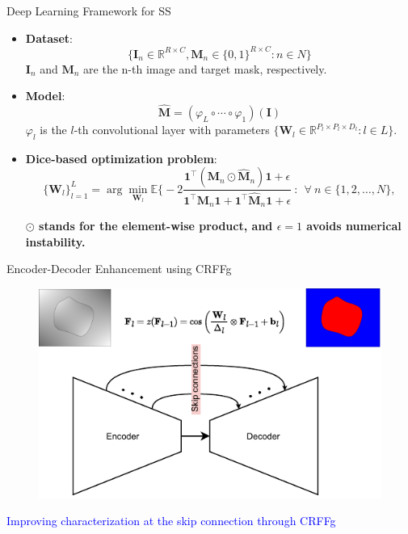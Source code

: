 \documentclass[aspectratio=169]{beamer}
\begin{document}
\begin{frame}{Deep Learning Framework for SS}


\begin{itemize}
    \item \textbf{Dataset}: $$\{\mathbf{I}_n \in \mathbb{R}^{R \times C} , \mathbf{M}_n \in \{ 0, 1\} ^{R \times C} : n \in N\}$$
    $\mathbf{I}_n$ and $\mathbf{M}_n$ are the n-th image and target mask, respectively.
    \item \textbf{Model}: 
    $$\mathbf{\hat{M}} = (\varphi_L \circ \dotsb \circ \varphi_1)(\mathbf{I})$$
    $\varphi_l$ is  the $l$-th convolutional layer with parameters $\{\mathbf{W}_l \in \mathbb{R}^{P_l \times P_l \times D_l} : l \in L\}$.
    \item \textbf{Dice-based optimization problem}:
    $$
	 \{\mathbf{W}_l\}^L_{l=1} = \arg\min_{\mathbf{W}_l}
		 \mathbb{E} \Big\{ -2 \frac{\mathbf{1}^\top(\mathbf{M}_n \odot \mathbf{\hat{M}}_n)\mathbf{1} + \epsilon}{\mathbf{1}^\top \mathbf{M}_n\mathbf{1} + \mathbf{1}^\top\mathbf{\hat{M}}_n\mathbf{1} + \epsilon} 
 \ : \ \ \forall \ n \in \{1,2,\dots,N \Big\} ,\label{eq:opt}
    $$
    
\hfill \textbf{\footnotesize{$\odot$ stands for the element-wise product, and  $\epsilon {=} 1$ avoids numerical instability.}}
\end{itemize}



\end{frame}


\begin{frame}{Encoder-Decoder Enhancement using CRFFg}

\begin{figure}
    \centering
    \includegraphics[width=0.6\linewidth]{Figures/improveCHara.pdf}
    
\end{figure}


\begin{center}
    \textcolor{blue}{Improving characterization at the skip connection through CRFFg}
\end{center}

\end{frame}
\end{document}
